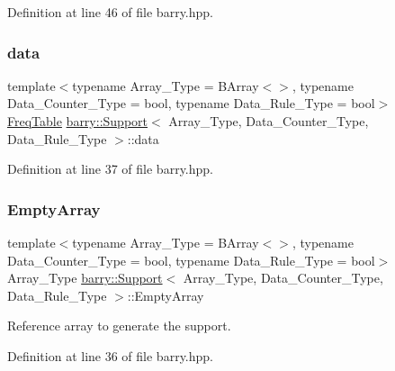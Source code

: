 Definition at line 46 of file barry.\+hpp.

\mbox{\label{classbarry_1_1_support_ab58b9801dcbb924d68fd18db0821de99}} 
\subsubsection{\texorpdfstring{data}{data}}
{\footnotesize\ttfamily template$<$typename Array\+\_\+\+Type  = B\+Array$<$$>$, typename Data\+\_\+\+Counter\+\_\+\+Type  = bool, typename Data\+\_\+\+Rule\+\_\+\+Type  = bool$>$ \\
\hyperlink{classbarry_1_1_freq_table}{Freq\+Table} \hyperlink{classbarry_1_1_support}{barry\+::\+Support}$<$ Array\+\_\+\+Type, Data\+\_\+\+Counter\+\_\+\+Type, Data\+\_\+\+Rule\+\_\+\+Type $>$\+::data}



Definition at line 37 of file barry.\+hpp.

\mbox{\label{classbarry_1_1_support_a2eec6569a9206965a679782f7acf12e5}} 
\subsubsection{\texorpdfstring{Empty\+Array}{EmptyArray}}
{\footnotesize\ttfamily template$<$typename Array\+\_\+\+Type  = B\+Array$<$$>$, typename Data\+\_\+\+Counter\+\_\+\+Type  = bool, typename Data\+\_\+\+Rule\+\_\+\+Type  = bool$>$ \\
Array\+\_\+\+Type \hyperlink{classbarry_1_1_support}{barry\+::\+Support}$<$ Array\+\_\+\+Type, Data\+\_\+\+Counter\+\_\+\+Type, Data\+\_\+\+Rule\+\_\+\+Type $>$\+::Empty\+Array}



Reference array to generate the support. 



Definition at line 36 of file barry.\+hpp.

\mbox{\label{classbarry_1_1_support_abdf54592050a1c0db0fc7b079a7f9703}} 
